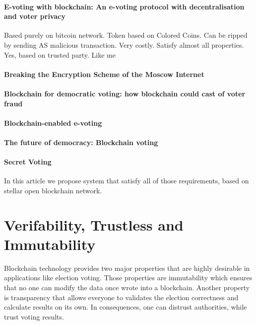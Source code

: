 \documentclass[runningheads]{llncs}
\begin{document}
\paragraph{E-voting with blockchain: An e-voting protocol with decentralisation and voter privacy ~\cite{hardwick2018voting} }
Based purely on bitcoin network. Token based on Colored Coins. Can be ripped by sending AS malicious transaction. Very costly. Satisfy almost all properties. Yes, based on trusted party. Like me

\paragraph{Breaking the Encryption Scheme of the Moscow Internet ~\cite{gaudry2019breaking} }




\paragraph{Blockchain for democratic voting: how blockchain could cast of voter fraud ~\cite{casado2018blockchain} }

\paragraph{Blockchain-enabled e-voting ~\cite{kshetri2018blockchain} }

\paragraph{The future of democracy: Blockchain voting ~\cite{osgood2016future}}

\paragraph{Secret Voting ~\cite{tam_2018} }


In this article we propose system that satisfy all of those requirements, based on stellar open blockchain network.



\section{Verifability, Trustless and Immutability}
 Blockchain technology provides two major properties that are highly desirable in applications like election voting. Those properties are immutability which ensures that no one can modify the data once wrote into a blockchain. Another property is transparency that allows everyone to validates the election correctness and calculate results on its own. In consequences, one can distrust authorities, while trust voting results. 
\end{document}
